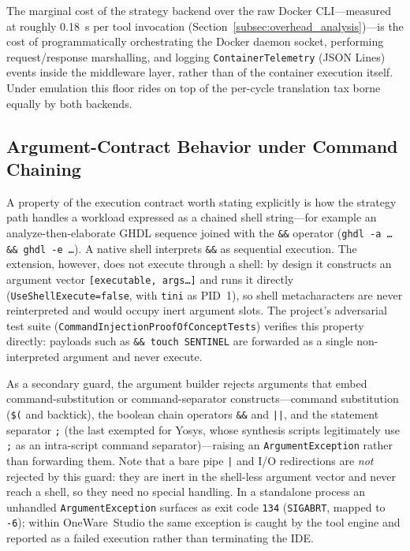 The marginal cost of the strategy backend over the raw Docker CLI---measured at roughly \SI{0.18}{\second} per tool invocation (Section~\ref{subsec:overhead_analysis})---is the cost of programmatically orchestrating the Docker daemon socket, performing request/response marshalling, and logging \texttt{ContainerTelemetry} (JSON Lines) events inside the middleware layer, rather than of the container execution itself. Under emulation this floor rides on top of the per-cycle translation tax borne equally by both backends.

\subsection{Argument-Contract Behavior under Command Chaining}
\label{subsec:arg_contract}
A property of the execution contract worth stating explicitly is how the strategy path handles a workload expressed as a chained shell string---for example an analyze-then-elaborate GHDL sequence joined with the \texttt{\&\&} operator (\texttt{ghdl -a \ldots \&\& ghdl -e \ldots}). A native shell interprets \texttt{\&\&} as sequential execution. The extension, however, does not execute through a shell: by design it constructs an argument vector \texttt{[executable, args\ldots]} and runs it directly (\texttt{UseShellExecute=false}, with \texttt{tini} as PID~1), so shell metacharacters are never reinterpreted and would occupy inert argument slots. The project's adversarial test suite (\texttt{CommandInjectionProofOfConceptTests}) verifies this property directly: payloads such as \texttt{\&\& touch SENTINEL} are forwarded as a single non-interpreted argument and never execute.

As a secondary guard, the argument builder rejects arguments that embed command-substitution or command-separator constructs---command substitution (\texttt{\$(} and backtick), the boolean chain operators \texttt{\&\&} and \texttt{||}, and the statement separator \texttt{;} (the last exempted for Yosys, whose synthesis scripts legitimately use \texttt{;} as an intra-script command separator)---raising an \texttt{ArgumentException} rather than forwarding them. Note that a bare pipe \texttt{|} and I/O redirections are \emph{not} rejected by this guard: they are inert in the shell-less argument vector and never reach a shell, so they need no special handling. In a standalone process an unhandled \texttt{ArgumentException} surfaces as exit code \texttt{134} (\texttt{SIGABRT}, mapped to \texttt{-6}); within OneWare~Studio the same exception is caught by the tool engine and reported as a failed execution rather than terminating the IDE.

